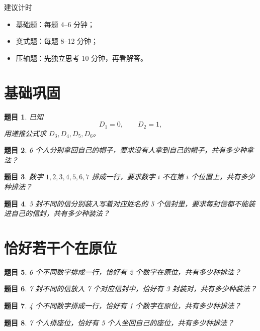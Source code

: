 \documentclass[11pt,a4paper,fontset=fandol]{ctexart}
\theoremstyle{formalexample}
\newtheorem{exercise}{题目}[section]
\begin{document}
\begin{notebox}{建议计时}
\begin{itemize}
  \item 基础题：每题 4--6 分钟；
  \item 变式题：每题 8--12 分钟；
  \item 压轴题：先独立思考 10 分钟，再看解答。
\end{itemize}
\end{notebox}

\section{基础巩固}

\begin{exercise}
已知
\[
D_1=0,\qquad D_2=1,
\]
用递推公式求 $D_3,D_4,D_5,D_6$。
\end{exercise}

\begin{exercise}
6 个人分别拿回自己的帽子，要求没有人拿到自己的帽子，共有多少种拿法？
\end{exercise}

\begin{exercise}
数字 $1,2,3,4,5,6,7$ 排成一行，要求数字 $i$ 不在第 $i$ 个位置上，共有多少种排法？
\end{exercise}

\begin{exercise}
5 封不同的信分别装入写着对应姓名的 5 个信封里，要求每封信都不能装进自己的信封，共有多少种装法？
\end{exercise}

\section{恰好若干个在原位}

\begin{exercise}
6 个不同数字排成一行，恰好有 2 个数字在原位，共有多少种排法？
\end{exercise}

\begin{exercise}
7 封不同的信放入 7 个对应信封中，恰好有 3 封装对，共有多少种装法？
\end{exercise}

\begin{exercise}
4 个不同数字排成一行，恰好有 1 个数字在原位，共有多少种排法？
\end{exercise}

\begin{exercise}
7 个人排座位，恰好有 5 个人坐回自己的座位，共有多少种排法？
\end{exercise}
\end{document}
